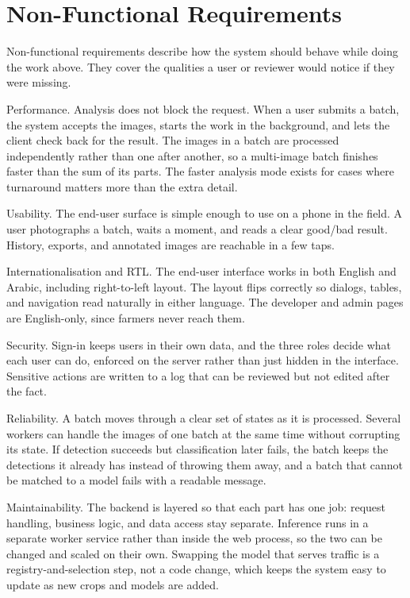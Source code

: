 \section{Non-Functional Requirements}
\label{sec:ch3-nfr}

Non-functional requirements describe how the system should behave while doing the
work above. They cover the qualities a user or reviewer would notice if they were
missing.

Performance. Analysis does not block the request. When a user submits a batch,
the system accepts the images, starts the work in the background, and lets the
client check back for the result. The images in a batch are processed
independently rather than one after another, so a multi-image batch finishes
faster than the sum of its parts. The faster analysis mode exists for cases where
turnaround matters more than the extra detail.

Usability. The end-user surface is simple enough to use on a phone in the field.
A user photographs a batch, waits a moment, and reads a clear good/bad result.
History, exports, and annotated images are reachable in a few taps.

Internationalisation and RTL. The end-user interface works in both English and
Arabic, including right-to-left layout. The layout flips correctly so dialogs,
tables, and navigation read naturally in either language. The developer and admin
pages are English-only, since farmers never reach them.

Security. Sign-in keeps users in their own data, and the three roles decide what
each user can do, enforced on the server rather than just hidden in the
interface. Sensitive actions are written to a log that can be reviewed but not
edited after the fact.

Reliability. A batch moves through a clear set of states as it is processed.
Several workers can handle the images of one batch at the same time without
corrupting its state. If detection succeeds but classification later fails, the
batch keeps the detections it already has instead of throwing them away, and a
batch that cannot be matched to a model fails with a readable message.

Maintainability. The backend is layered so that each part has one job: request
handling, business logic, and data access stay separate. Inference runs in a
separate worker service rather than inside the web process, so the two can be
changed and scaled on their own. Swapping the model that serves traffic is a
registry-and-selection step, not a code change, which keeps the system easy to
update as new crops and models are added.

